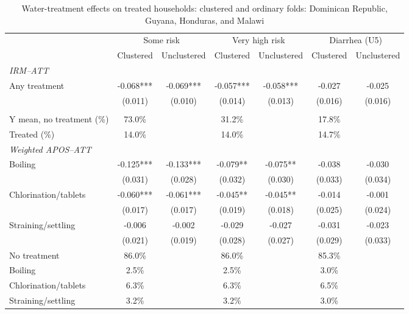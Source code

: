 \begin{table}[htbp]
\centering
\caption{Water-treatment effects on treated households: clustered and ordinary folds: Dominican Republic, Guyana, Honduras, and Malawi}
\label{tab:water-treatment-appendix-selected-countries}
\scriptsize
\setlength{\tabcolsep}{4pt}
\renewcommand{\arraystretch}{0.92}
\begin{adjustbox}{max width=\linewidth}
\begin{tabular}{lcccccc}
\hline\hline
 & \multicolumn{2}{c}{Some risk} & \multicolumn{2}{c}{Very high risk} & \multicolumn{2}{c}{Diarrhea (U5)} \\
 & Clustered & Unclustered & Clustered & Unclustered & Clustered & Unclustered \\
\hline
\multicolumn{7}{l}{\textit{IRM--ATT}} \\
Any treatment & -0.068*** & -0.069*** & -0.057*** & -0.058*** & -0.027 & -0.025 \\
 & (0.011) & (0.010) & (0.014) & (0.013) & (0.016) & (0.016) \\
\addlinespace[6pt]
\multicolumn{7}{l}{\textit{Descriptive statistics}} \\
Y mean, no treatment (\%) & 73.0\% &  & 31.2\% &  & 17.8\% &  \\
Treated (\%) & 14.0\% &  & 14.0\% &  & 14.7\% &  \\
\midrule
\multicolumn{7}{l}{\textit{Weighted APOS--ATT}} \\
Boiling & -0.125*** & -0.133*** & -0.079** & -0.075** & -0.038 & -0.030 \\
 & (0.031) & (0.028) & (0.032) & (0.030) & (0.033) & (0.034) \\
Chlorination/tablets & -0.060*** & -0.061*** & -0.045** & -0.045** & -0.014 & -0.001 \\
 & (0.017) & (0.017) & (0.019) & (0.018) & (0.025) & (0.024) \\
Straining/settling & -0.006 & -0.002 & -0.029 & -0.027 & -0.031 & -0.023 \\
 & (0.021) & (0.019) & (0.028) & (0.027) & (0.029) & (0.033) \\
\addlinespace[6pt]
No treatment & 86.0\% &  & 86.0\% &  & 85.3\% &  \\
Boiling & 2.5\% &  & 2.5\% &  & 3.0\% &  \\
Chlorination/tablets & 6.3\% &  & 6.3\% &  & 6.5\% &  \\
Straining/settling & 3.2\% &  & 3.2\% &  & 3.0\% &  \\

\end{tabular}
\end{adjustbox}
\end{table}
